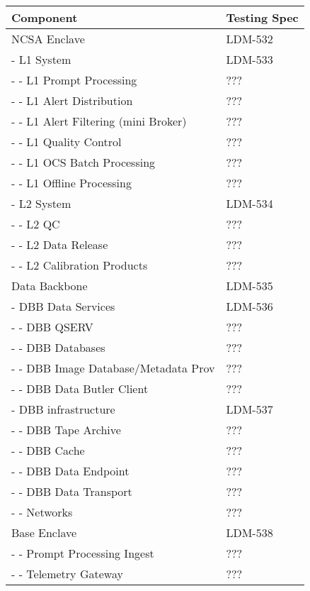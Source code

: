 \begin{longtable}{|p{}|p{}|}\hline 
 \bf Component & Testing Spec \\ \hline   
NCSA Enclave &  LDM-532 \\ \hline 
- L1 System &  LDM-533 \\ \hline 
- - L1 Prompt Processing &  ??? \\ \hline 
- - L1 Alert Distribution &  ??? \\ \hline 
- - L1 Alert Filtering (mini Broker) &  ??? \\ \hline 
- - L1 Quality Control &  ??? \\ \hline 
- - L1 OCS Batch Processing &  ??? \\ \hline 
- - L1 Offline Processing &  ??? \\ \hline 
- L2 System &  LDM-534 \\ \hline 
- - L2 QC &  ??? \\ \hline 
- - L2 Data Release &  ??? \\ \hline 
- - L2 Calibration Products &  ??? \\ \hline 
Data Backbone &  LDM-535 \\ \hline 
- DBB Data Services &  LDM-536 \\ \hline 
- - DBB QSERV &  ??? \\ \hline 
- - DBB Databases &  ??? \\ \hline 
- - DBB Image Database/Metadata Prov &  ??? \\ \hline 
- - DBB Data Butler Client &  ??? \\ \hline 
- DBB infrastructure &  LDM-537 \\ \hline 
- - DBB Tape Archive &  ??? \\ \hline 
- - DBB Cache &  ??? \\ \hline 
- - DBB Data Endpoint &  ??? \\ \hline 
- - DBB Data Transport &  ??? \\ \hline 
- - Networks  &  ??? \\ \hline 
Base Enclave &  LDM-538 \\ \hline 
- - Prompt Processing Ingest  &  ??? \\ \hline 
- - Telemetry Gateway &  ??? \\ \hline 

\end{longtable}

